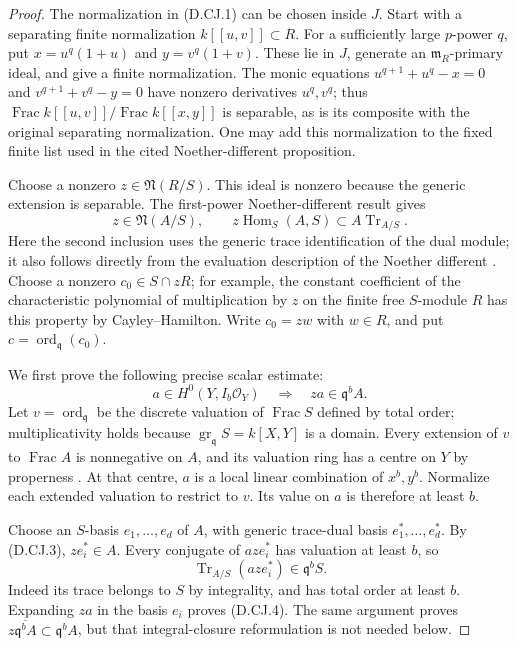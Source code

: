 \begin{proof}
The normalization in (D.CJ.1) can be chosen inside $J$.
Start with a separating finite normalization $k[[u,v]]\subset R$.
For a sufficiently large $p$-power $q$, put
$x=u^q(1+u)$ and $y=v^q(1+v)$. These lie in $J$, generate an
$\mathfrak m_R$-primary ideal, and give a finite normalization.
The monic equations $u^{q+1}+u^q-x=0$ and
$v^{q+1}+v^q-y=0$ have nonzero derivatives $u^q,v^q$;
thus $\operatorname{Frac}k[[u,v]]/\operatorname{Frac}k[[x,y]]$
is separable, as is its composite with the original separating
normalization. One may add this normalization to the fixed finite
list used in the cited Noether-different proposition.

Choose a nonzero $z\in\mathfrak N(R/S)$. This ideal is nonzero
because the generic extension is separable. The first-power
Noether-different result gives
\[
 z\in\mathfrak N(A/S),\qquad
 z\operatorname{Hom}_S(A,S)\subset A\operatorname{Tr}_{A/S}.
                                                        \tag{D.CJ.3}
\]
Here the second inclusion uses the generic trace identification of
the dual module; it also follows directly from the evaluation
description of the Noether different
\citep[Lemma~49.6.7 and complete proof, Tag 0BVT]
{StacksCanonicalJetsB}. Choose a nonzero $c_0\in S\cap zR$;
for example, the constant coefficient of the characteristic
polynomial of multiplication by $z$ on the finite free $S$-module
$R$ has this property by Cayley--Hamilton. Write $c_0=zw$ with
$w\in R$, and put $c=\operatorname{ord}_{\mathfrak q}(c_0)$.

We first prove the following precise scalar estimate:
\[
 a\in H^0(Y,I_b\mathcal O_Y)
                  \quad\Longrightarrow\quad za\in\mathfrak q^bA.
                                                        \tag{D.CJ.4}
\]
Let $v=\operatorname{ord}_{\mathfrak q}$ be the discrete valuation
of $\operatorname{Frac}S$ defined by total order; multiplicativity
holds because $\operatorname{gr}_{\mathfrak q}S=k[X,Y]$ is a domain.
Every extension of $v$ to $\operatorname{Frac}A$ is nonnegative on
$A$, and its valuation ring has a centre on $Y$ by properness
\citep[Lemma~29.43.1, valuative criterion for properness]
{StacksCanonicalJetsB}. At that centre, $a$ is a local linear
combination of $x^b,y^b$. Normalize each extended valuation to
restrict to $v$. Its value on $a$ is therefore at least $b$.

Choose an $S$-basis $e_1,\ldots,e_d$ of $A$, with generic
trace-dual basis $e_1^*,\ldots,e_d^*$. By (D.CJ.3),
$ze_i^*\in A$. Every conjugate of $aze_i^*$ has valuation at
least $b$, so
\[
         \operatorname{Tr}_{A/S}(aze_i^*)\in\mathfrak q^bS.
\]
Indeed its trace belongs to $S$ by integrality, and has total
order at least $b$. Expanding $za$ in the basis $e_i$ proves
(D.CJ.4). The same argument proves
$z\overline{\mathfrak q^bA}\subset\mathfrak q^bA$, but that
integral-closure reformulation is not needed below.


\end{proof}
